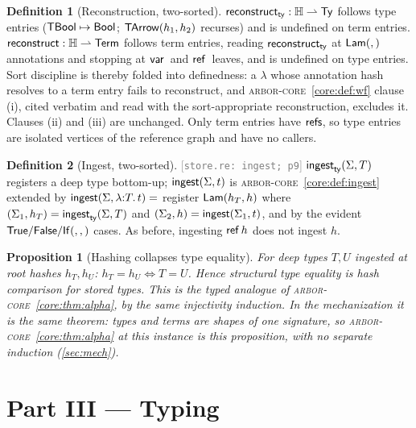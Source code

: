 \documentclass[11pt]{article}
\theoremstyle{definition}
\newtheorem{definition}{Definition}[section]
\theoremstyle{plain}
\newtheorem{proposition}[theorem]{Proposition}
\theoremstyle{remark}
\newcommand{\src}[1]{{\footnotesize\textcolor{gray}{[\texttt{#1}]}}}
\newcommand{\arborcore}{\textsc{arbor-core}}
\newcommand{\coreref}[1]{\arborcore~\cref{core:#1}}
\begin{document}
\begin{definition}[Reconstruction, two-sorted]\label{def:reconstruct}
$\mathsf{reconstruct}_{\mathsf{ty}} : \mathbb{H} \rightharpoonup \mathsf{Ty}$ follows type entries
($\mathsf{TBool} \mapsto \mathsf{Bool}$; $\mathsf{TArrow}(h_1,h_2)$ recurses) and is undefined on term entries.
$\mathsf{reconstruct} : \mathbb{H} \rightharpoonup \mathsf{Term}$ follows term entries, reading $\mathsf{reconstruct}_{\mathsf{ty}}$ at
$\mathsf{Lam}(,)$ annotations and stopping at $\mathsf{var}\,$ and $\mathsf{ref}\,$ leaves, and is undefined on
type entries. Sort discipline is thereby folded into definedness: a $\lambda$ whose annotation
hash resolves to a term entry fails to reconstruct, and \coreref{def:wf} clause (i), cited
verbatim and read with the sort-appropriate reconstruction, excludes it. Clauses (ii) and
(iii) are unchanged. Only term entries have $\mathsf{refs}$, so type entries are isolated vertices of
the reference graph and have no callers.
\end{definition}

\begin{definition}[Ingest, two-sorted]\label{def:ingest}
\src{store.re: ingest; p9} $\mathsf{ingest}_{\mathsf{ty}}(\Sigma, T)$ registers a deep type bottom-up;
$\mathsf{ingest}(\Sigma, t)$ is \coreref{def:ingest} extended by
$\mathsf{ingest}(\Sigma, \lambda{:}T.\,t) = $ register $\mathsf{Lam}(h_T,h)$ where
$(\Sigma_1, h_T) = \mathsf{ingest}_{\mathsf{ty}}(\Sigma, T)$ and $(\Sigma_2, h) = \mathsf{ingest}(\Sigma_1, t)$, and by
the evident $\mathsf{True}/\mathsf{False}/\mathsf{If}(,,)$ cases. As before, ingesting $\mathsf{ref}\,h$ does not
ingest $h$.
\end{definition}

\begin{proposition}[Hashing collapses type equality]\label{prop:ty-ident}
For deep types $T, U$ ingested at root hashes $h_T, h_U$: $h_T = h_U \iff T = U$. Hence
structural type equality is hash comparison for stored types. This is the typed analogue of
\coreref{thm:alpha}, by the same injectivity induction. In the mechanization it is the same
theorem: types and terms are shapes of one signature, so \coreref{thm:alpha} at this instance
is this proposition, with no separate induction (\cref{sec:mech}).
\end{proposition}

\section{Part III --- Typing}\label{sec:typing}
\end{document}

